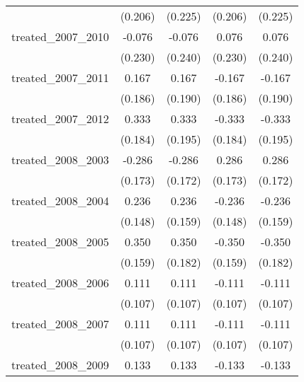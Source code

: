 {\begin{tabular}{l*{4}{c}}
            &     (0.206)         &     (0.225)         &     (0.206)         &     (0.225)         \\
[1em]
treated\_2007\_2010&      -0.076         &      -0.076         &       0.076         &       0.076         \\
            &     (0.230)         &     (0.240)         &     (0.230)         &     (0.240)         \\
[1em]
treated\_2007\_2011&       0.167         &       0.167         &      -0.167         &      -0.167         \\
            &     (0.186)         &     (0.190)         &     (0.186)         &     (0.190)         \\
[1em]
treated\_2007\_2012&       0.333         &       0.333         &      -0.333         &      -0.333         \\
            &     (0.184)         &     (0.195)         &     (0.184)         &     (0.195)         \\
[1em]
treated\_2008\_2003&      -0.286         &      -0.286         &       0.286         &       0.286         \\
            &     (0.173)         &     (0.172)         &     (0.173)         &     (0.172)         \\
[1em]
treated\_2008\_2004&       0.236         &       0.236         &      -0.236         &      -0.236         \\
            &     (0.148)         &     (0.159)         &     (0.148)         &     (0.159)         \\
[1em]
treated\_2008\_2005&       0.350\sym{*}  &       0.350         &      -0.350\sym{*}  &      -0.350         \\
            &     (0.159)         &     (0.182)         &     (0.159)         &     (0.182)         \\
[1em]
treated\_2008\_2006&       0.111         &       0.111         &      -0.111         &      -0.111         \\
            &     (0.107)         &     (0.107)         &     (0.107)         &     (0.107)         \\
[1em]
treated\_2008\_2007&       0.111         &       0.111         &      -0.111         &      -0.111         \\
            &     (0.107)         &     (0.107)         &     (0.107)         &     (0.107)         \\
[1em]
treated\_2008\_2009&       0.133         &       0.133         &      -0.133         &      -0.133         \\

\end{tabular}}
